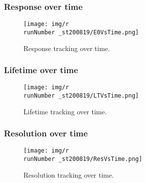 \begin{frame}
\frametitle{Response over time}
\begin{figure}
  \begin{center}
      \texttt{[image: img/r\\runNumber \_st200819/E0VsTime.png]}
    \caption{Response tracking over time.}
  \end{center}
\end{figure}
\end{frame}

\begin{frame}
\frametitle{Lifetime over time}
\begin{figure}
  \begin{center}
      \texttt{[image: img/r\\runNumber \_st200819/LTVsTime.png]}
    \caption{Lifetime tracking over time.}
  \end{center}
\end{figure}
\end{frame}

\begin{frame}
\frametitle{Resolution over time}
\begin{figure}
  \begin{center}
      \texttt{[image: img/r\\runNumber \_st200819/ResVsTime.png]}
    \caption{Resolution tracking over time.}
  \end{center}
\end{figure}
\end{frame}
